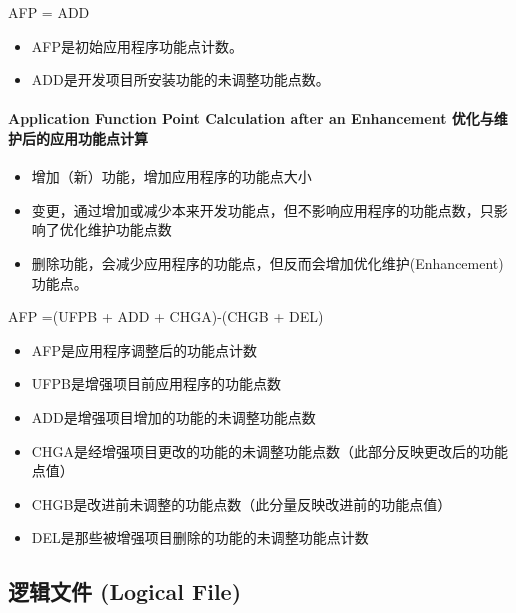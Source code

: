 AFP = ADD

\begin{itemize}
\tightlist
\item
  AFP是初始应用程序功能点计数。
\item
  ADD是开发项目所安装功能的未调整功能点数。
\end{itemize}

\hypertarget{application-function-point-calculation-after-an-enhancement-ux4f18ux5316ux4e0eux7ef4ux62a4ux540eux7684ux5e94ux7528ux529fux80fdux70b9ux8ba1ux7b97}{%
\paragraph{Application Function Point Calculation after an Enhancement
优化与维护后的应用功能点计算}\label{application-function-point-calculation-after-an-enhancement-ux4f18ux5316ux4e0eux7ef4ux62a4ux540eux7684ux5e94ux7528ux529fux80fdux70b9ux8ba1ux7b97}}

\begin{itemize}
\tightlist
\item
  增加（新）功能，增加应用程序的功能点大小
\item
  变更，通过增加或减少本来开发功能点，但不影响应用程序的功能点数，只影响了优化维护功能点数
\item
  删除功能，会减少应用程序的功能点，但反而会增加优化维护(Enhancement)功能点。
\end{itemize}

AFP =(UFPB + ADD + CHGA)-(CHGB + DEL)

\begin{itemize}
\tightlist
\item
  AFP是应用程序调整后的功能点计数
\item
  UFPB是增强项目前应用程序的功能点数
\item
  ADD是增强项目增加的功能的未调整功能点数
\item
  CHGA是经增强项目更改的功能的未调整功能点数（此部分反映更改后的功能点值）
\item
  CHGB是改进前未调整的功能点数（此分量反映改进前的功能点值）
\item
  DEL是那些被增强项目删除的功能的未调整功能点计数
\end{itemize}

\hypertarget{ux903bux8f91ux6587ux4ef6-logical-file}{%
\subsection{逻辑文件 (Logical
File)}\label{ux903bux8f91ux6587ux4ef6-logical-file}}

